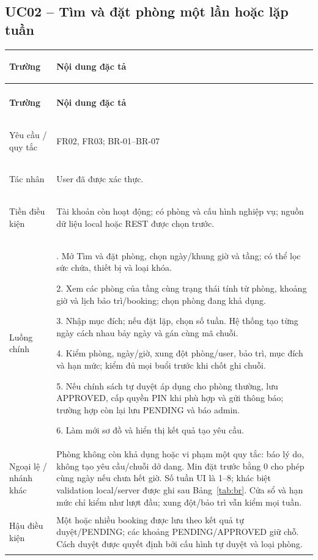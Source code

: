 \subsection{UC02 -- Tìm và đặt phòng một lần hoặc lặp tuần}\label{tab:uc02}
{\small\renewcommand{\arraystretch}{1.06}
\setlength{\tabcolsep}{6pt}\setlength{\extrarowheight}{2pt}
\renewcommand{\theHtable}{uc.\arabic{subsection}}\addtocounter{table}{-1}
\begin{longtable}{|>{\bfseries\raggedright\arraybackslash}p{3cm}|>{\raggedright\arraybackslash}p{\dimexpr\textwidth-3cm-4\tabcolsep-3\arrayrulewidth\relax}|}
\hline
\textbf{Trường} & \textbf{Nội dung đặc tả}\\\hline
\endfirsthead
\multicolumn{2}{r}{\small\itshape UC02 (tiếp)}\\
\hline
\textbf{Trường} & \textbf{Nội dung đặc tả}\\\hline
\endhead
\endlastfoot
Yêu cầu / quy tắc & FR02, FR03; BR-01--BR-07\\*\hline
Tác nhân & User đã được xác thực.\\*\hline
Tiền điều kiện & Tài khoản còn hoạt động; có phòng và cấu hình nghiệp vụ; nguồn dữ liệu local hoặc REST được chọn trước.\\*\hline
Luồng chính & 1. Mở Tìm và đặt phòng, chọn ngày/khung giờ và tầng; có thể lọc sức chứa, thiết bị và loại khóa.\par
2. Xem các phòng của tầng cùng trạng thái tính từ phòng, khoảng giờ và lịch bảo trì/booking; chọn phòng đang khả dụng.\par
3. Nhập mục đích; nếu đặt lặp, chọn số tuần. Hệ thống tạo từng ngày cách nhau bảy ngày và gán cùng mã chuỗi.\par
4. Kiểm phòng, ngày/giờ, xung đột phòng/user, bảo trì, mục đích và hạn mức; kiểm đủ mọi buổi trước khi chốt ghi chuỗi.\par
5. Nếu chính sách tự duyệt áp dụng cho phòng thường, lưu APPROVED, cấp quyền PIN khi phù hợp và gửi thông báo; trường hợp còn lại lưu PENDING và báo admin.\par
6. Làm mới sơ đồ và hiển thị kết quả tạo yêu cầu.\\\hline
Ngoại lệ / nhánh khác & Phòng không còn khả dụng hoặc vi phạm một quy tắc: báo lý do, không tạo yêu cầu/chuỗi dở dang. Min đặt trước bằng 0 cho phép cùng ngày nếu chưa hết giờ. Số tuần UI là 1--8; khác biệt validation local/server được ghi sau Bảng~\ref{tab:br}. Cửa sổ và hạn mức chỉ kiểm như lượt đầu; xung đột/bảo trì vẫn kiểm mọi tuần.\\\hline
Hậu điều kiện & Một hoặc nhiều booking được lưu theo kết quả tự duyệt/PENDING; các khoảng PENDING/APPROVED giữ chỗ. Cách duyệt được quyết định bởi cấu hình tự duyệt và loại phòng.\\\hline
\end{longtable}}

